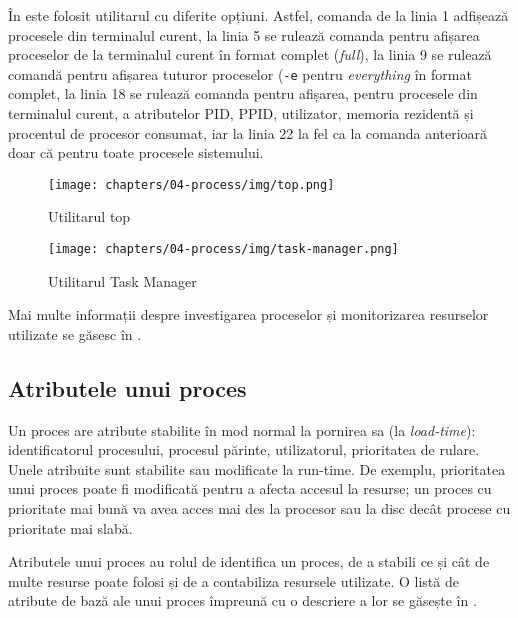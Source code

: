 În  este folosit utilitarul  cu diferite opțiuni. Astfel, comanda de la linia 1 adfișează procesele din terminalul curent, la linia 5 se rulează comanda pentru afișarea proceselor de la terminalul curent în format complet (\textit{full}), la linia 9 se rulează comandă pentru afișarea tuturor proceselor (\texttt{-e} pentru \textit{everything} în format complet, la linia 18 se rulează comanda pentru afișarea, pentru procesele din terminalul curent, a atributelor PID, PPID, utilizator, memoria rezidentă și procentul de procesor consumat, iar la linia 22 la fel ca la comanda anterioară doar că pentru toate procesele sistemului.

\begin{figure}[!htbp]
	\centering
	\texttt{[image: chapters/04-process/img/top.png]}
	\caption{Utilitarul top}
	\label{fig:process:top}
\end{figure}

\begin{figure}[!htbp]
	\centering
	\texttt{[image: chapters/04-process/img/task-manager.png]}
	\caption{Utilitarul Task Manager}
	\label{fig:process:task-manager}
\end{figure}

Mai multe informații despre investigarea proceselor și monitorizarea resurselor
utilizate se găsesc în .

\subsection{Atributele unui proces}
\label{sec:process:attributes}

Un proces are atribute stabilite în mod normal la pornirea sa (la \textit{load-time}):
identificatorul procesului, procesul părinte, utilizatorul, prioritatea de
rulare. Unele atribuite sunt stabilite sau modificate la run-time. De exemplu,
prioritatea unui proces poate fi modificată pentru a afecta accesul la resurse;
un proces cu prioritate mai bună va avea acces mai des la procesor sau la disc
decât procese cu prioritate mai slabă.

Atributele unui proces au rolul de identifica un proces, de a stabili ce și cât
de multe resurse poate folosi și de a contabiliza resursele utilizate. O listă de
atribute de bază ale unui proces împreună cu o descriere a lor se găsește în
.

